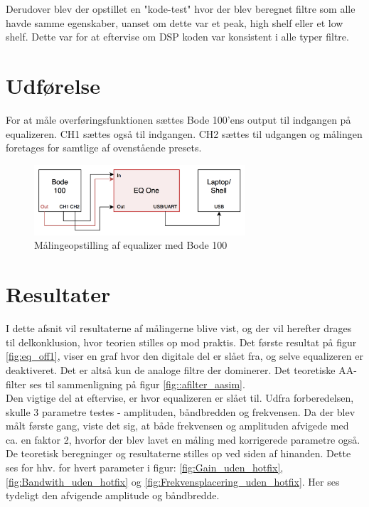 Derudover blev der opstillet en "kode-test" hvor der blev beregnet filtre som alle havde samme egenskaber, uanset om dette var et peak, high shelf eller et low shelf. Dette var for at eftervise om DSP koden var konsistent i alle typer filtre. \\

\section{Udførelse}
For at måle overføringsfunktionen sættes Bode 100'ens output til indgangen på equalizeren. CH1 sættes også til indgangen. CH2 sættes til udgangen og målingen foretages for samtlige af ovenstående presets. \\


\begin{figure}[h!]\label{fig:bode_setup}
	\centering
	\includegraphics[width=0.7\textwidth]{billeder/bode_setup}
	\caption{Målingeopstilling af equalizer med Bode 100}
\end{figure}	

\FloatBlock

\section{Resultater}
I dette afsnit vil resultaterne af målingerne blive vist, og der vil herefter drages til delkonklusion, hvor teorien stilles op mod praktis.
Det første resultat på figur \ref{fig:eq_off1}, viser en graf hvor den digitale del er slået fra, og selve equalizeren er deaktiveret. Det er altså kun de analoge filtre der dominerer. Det teoretiske AA-filter ses til sammenligning på figur \ref{fig::afilter_aasim}. \\
Den vigtige del at eftervise, er hvor equalizeren er slået til. 
Udfra forberedelsen, skulle 3 parametre testes - amplituden, båndbredden og frekvensen. 
Da der blev målt første gang, viste det sig, at både frekvensen og amplituden afvigede med ca. en faktor 2, hvorfor der blev lavet en måling med korrigerede parametre også.
De teoretisk beregninger og resultaterne stilles op ved siden af hinanden.
Dette ses for hhv. for hvert parameter i figur: \ref{fig:Gain_uden_hotfix}, \ref{fig:Bandwith_uden_hotfix} og \ref{fig:Frekvensplacering_uden_hotfix}. 
Her ses tydeligt den afvigende amplitude og båndbredde.

